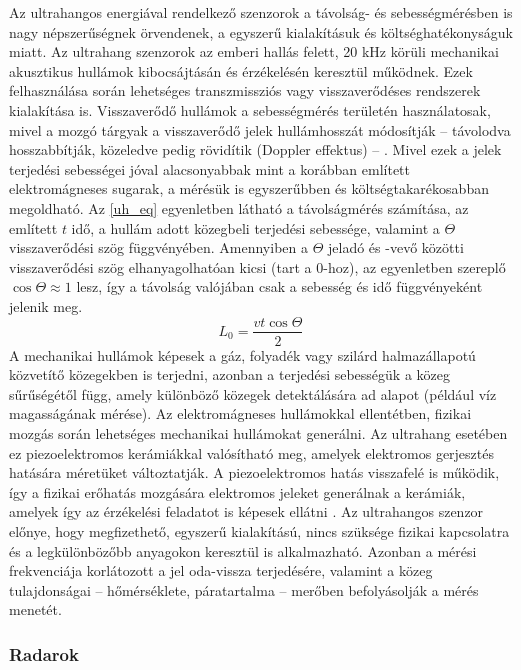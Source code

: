 Az ultrahangos energiával rendelkező szenzorok a távolság- és sebességmérésben is nagy népszerűségnek örvendenek, a egyszerű kialakításuk és költséghatékonyságuk miatt. Az ultrahang szenzorok az emberi hallás felett, 20 kHz körüli mechanikai akusztikus hullámok kibocsájtásán és érzékelésén keresztül működnek. Ezek felhasználása során lehetséges transzmissziós vagy visszaverődéses rendszerek kialakítása is. Visszaverődő hullámok a sebességmérés területén használatosak, mivel a mozgó tárgyak a visszaverődő jelek hullámhosszát módosítják -- távolodva hosszabbítják, közeledve pedig rövidítik (Doppler effektus) -- \cite{Fraden2016a}. Mivel ezek a jelek terjedési sebességei jóval alacsonyabbak mint a korábban említett elektromágneses sugarak, a mérésük is egyszerűbben és költségtakarékosabban megoldható. Az \ref{uh_eq} egyenletben látható a távolságmérés számítása, az említett $t$ idő, a hullám adott közegbeli terjedési sebessége, valamint a $\Theta$ visszaverődési szög függvényében. Amennyiben a $\Theta$ jeladó és -vevő közötti visszaverődési szög elhanyagolhatóan kicsi (tart a $0$-hoz), az egyenletben szereplő $\cos{\Theta} \approx 1$ lesz, így a távolság valójában csak a sebesség és idő függvényeként jelenik meg.
\begin{equation}
	L_0 = \frac{v t \cos{\Theta}}{2}
	\label{uh_eq}
\end{equation}
A mechanikai hullámok képesek a gáz, folyadék vagy szilárd halmazállapotú közvetítő közegekben is terjedni, azonban a terjedési sebességük a közeg sűrűségétől függ, amely különböző közegek detektálására ad alapot (például víz magasságának mérése). Az elektromágneses hullámokkal ellentétben, fizikai mozgás során lehetséges mechanikai hullámokat generálni. Az ultrahang esetében ez piezoelektromos kerámiákkal valósítható meg, amelyek elektromos gerjesztés hatására méretüket változtatják. A piezoelektromos hatás visszafelé is működik, így a fizikai erőhatás mozgására elektromos jeleket generálnak a kerámiák, amelyek így az érzékelési feladatot is képesek ellátni \cite{Fraden2016a}. Az ultrahangos szenzor előnye, hogy megfizethető, egyszerű kialakítású, nincs szüksége fizikai kapcsolatra és a legkülönbözőbb anyagokon keresztül is alkalmazható. Azonban a mérési frekvenciája korlátozott a jel oda-vissza terjedésére, valamint a közeg tulajdonságai -- hőmérséklete, páratartalma -- merőben befolyásolják a mérés menetét.

\subsubsection{Radarok}

